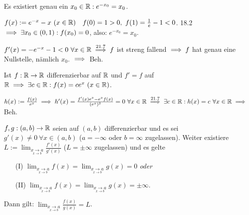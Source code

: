 \documentclass[a4paper,twoside,DIV15,BCOR12mm]{scrbook}
\begin{document}
\begin{beispiele}
\item Es existiert genau ein $x_0 \in \mathbb{R}: e^{-x_0} = x_0$.
	\begin{beweis}
	$f(x) := e^{-x}-x\ (x \in \mathbb{R})\quad f(0) = 1 > 0,\ f(1) = \frac{1}{e}-1 < 0$. 18.2 $\implies \exists x_0 \in (0,1): f(x_0) = 0$, also: $e^{-x_0} = x_0$.

	$f'(x) = -e^{-x}-1 < 0\ \forall x \in \mathbb{R} \overset{\text{21.7}}{\implies} f$ ist streng fallend $\implies f$ hat genau eine Nullstelle, nämlich $x_0$. $\implies$ Beh.
	\end{beweis}
\item Ist $f: \mathbb{R} \to \mathbb{R}$ differenzierbar auf $\mathbb{R}$ und $f' = f$ auf $\mathbb{R} \implies \exists c \in \mathbb{R}: f(x) = ce^x\ (x \in \mathbb{R})$.
	\begin{beweis}
	$h(x) := \frac{f(x)}{e^x} \implies h'(x) = \frac{f'(x)e^x - e^xf(x)}{(e^x)^2} = 0\ \forall x \in \mathbb{R} \overset{\text{21.7}}{\implies} \exists c \in \mathbb{R}: h(x) = c\ \forall x \in \mathbb{R} \implies$ Beh.
	\end{beweis}
\end{beispiele}

\newcommand{\dlim}[2]{\displaystyle{\lim_{#1}{#2}}}

\begin{satz}
$f,g:(a,b) \to \mathbb{R}$ seien auf $(a,b)$ differenzierbar und es sei $g'(x) \ne 0\ \forall x \in (a,b)$ ($a=-\infty$ oder $b=\infty$ zugelassen). Weiter existiere $L := \dlim{\underset{x \to b}{x \to a}}{\frac{f'(x)}{g'(x)}}$ ($L=\pm\infty$ zugelassen) und es gelte
\begin{enumerate}
\item[(I)] $\dlim{\underset{x \to b}{x \to a}}{f(x)} = \dlim{\underset{x \to b}{x \to a}}{g(x)} = 0$ \emph{oder}
\item[(II)] $\dlim{\underset{x \to b}{x \to a}}{f(x)} = \dlim{\underset{x \to b}{x \to a}}{g(x)} = \pm\infty$.
\end{enumerate}

Dann gilt: $\dlim{\underset{x \to b}{x \to a}}{\frac{f(x)}{g(x)}} = L$.
\end{satz}
\end{document}
